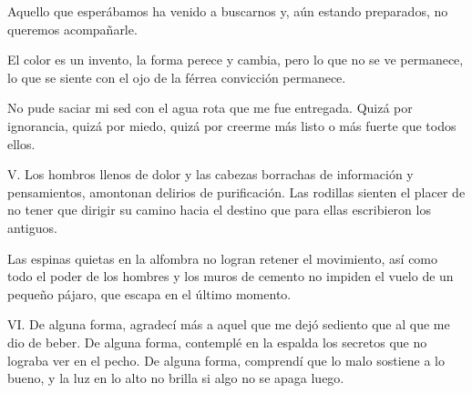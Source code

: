 Aquello que esperábamos
ha venido a buscarnos y,
aún estando preparados,
no queremos acompañarle.

El color es un invento,
la forma perece y cambia,
pero lo que no se ve permanece,
lo que se siente con el ojo
de la férrea convicción permanece.

No pude saciar mi sed
con el agua rota que me fue entregada.
Quizá por ignorancia,   
quizá por miedo,
quizá por creerme más listo
o más fuerte
que todos ellos.

V. Los hombros llenos de dolor
y las cabezas borrachas de información
y pensamientos,
amontonan delirios de purificación.
Las rodillas sienten el placer
de no tener que dirigir su camino
hacia el destino que para ellas escribieron los antiguos.

Las espinas quietas en la alfombra
no logran retener el movimiento,
así como todo el poder de los hombres
y los muros de cemento
no impiden el vuelo de un pequeño pájaro,
que escapa en el último momento.

VI. De alguna forma,
agradecí más a aquel que me dejó sediento
que al que me dio de beber.
De alguna forma, 
contemplé en la espalda los secretos
que no lograba ver en el pecho.
De alguna forma,
comprendí que lo malo sostiene a lo bueno,
y la luz en lo alto no brilla
si algo no se apaga luego.

